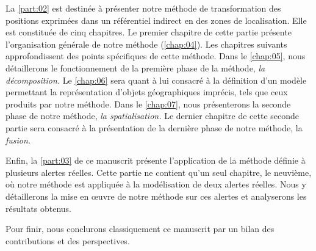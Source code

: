 La \autoref{part:02} est destinée à présenter notre méthode de
transformation des positions exprimées dans un référentiel indirect en
des zones de localisation. Elle est constituée de cinq chapitres. Le
premier chapitre de cette partie présente l’organisation générale de
notre méthode (\autoref{chap:04}). Les chapitres suivants
approfondissent des points spécifiques de cette méthode. Dans le
\autoref{chap:05}, nous détaillerons le fonctionnement de la première
phase de la méthode, \emph{la décomposition.} Le \autoref{chap:06}
sera quant à lui consacré à la définition d'un modèle permettant la
représentation d'objets géographiques imprécis, tels que ceux produits
par notre méthode. Dans le \autoref{chap:07}, nous présenterons la
seconde phase de notre méthode, \emph{la spatialisation.} Le dernier
chapitre de cette seconde partie sera consacré à la présentation de la
dernière phase de notre méthode, la \emph{fusion.}

Enfin, la \autoref{part:03} de ce manuscrit présente l’application de
la méthode définie à plusieurs alertes réelles. Cette partie ne
contient qu'un seul chapitre, le neuvième, où notre méthode est
appliquée à la modélisation de deux alertes réelles. Nous y
détaillerons la mise en œuvre de notre méthode sur ces alertes et
analyserons les résultats obtenus.

Pour finir, nous conclurons classiquement ce manuscrit par un bilan
des contributions et des perspectives.

